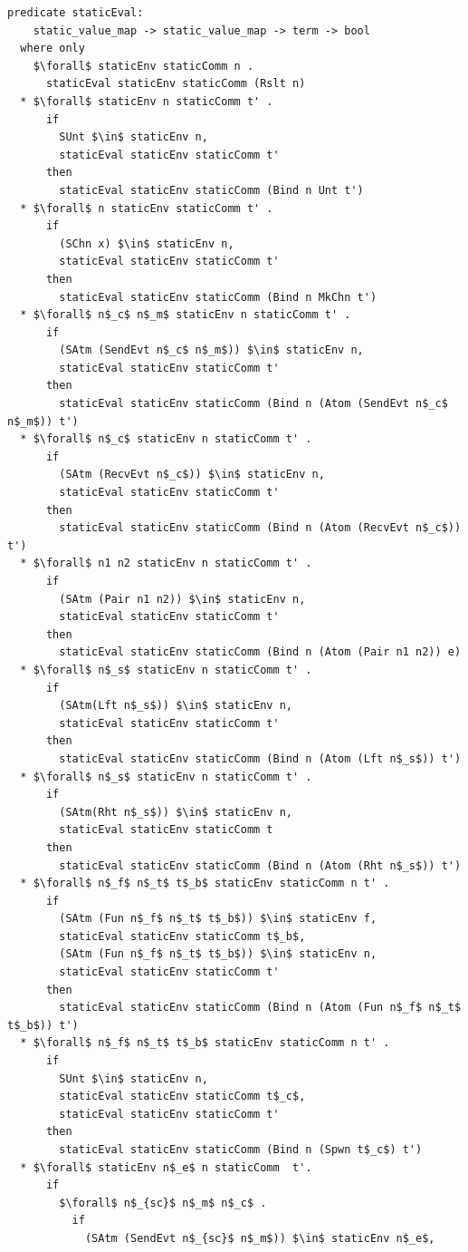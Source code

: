\documentclass[letterpaper, 11pt]{extarticle}
\begin{document}
\begin{lstlisting}[language=logic, mathescape]
  predicate staticEval:
    static_value_map -> static_value_map -> term -> bool
  where only
    $\forall$ staticEnv staticComm n .
      staticEval staticEnv staticComm (Rslt n)
  * $\forall$ staticEnv n staticComm t' .
      if 
        SUnt $\in$ staticEnv n,
        staticEval staticEnv staticComm t'
      then
        staticEval staticEnv staticComm (Bind n Unt t')
  * $\forall$ n staticEnv staticComm t' .
      if 
        (SChn x) $\in$ staticEnv n,
        staticEval staticEnv staticComm t'
      then  
        staticEval staticEnv staticComm (Bind n MkChn t')
  * $\forall$ n$_c$ n$_m$ staticEnv n staticComm t' .
      if
        (SAtm (SendEvt n$_c$ n$_m$)) $\in$ staticEnv n,
        staticEval staticEnv staticComm t' 
      then
        staticEval staticEnv staticComm (Bind n (Atom (SendEvt n$_c$ n$_m$)) t')
  * $\forall$ n$_c$ staticEnv n staticComm t' . 
      if 
        (SAtm (RecvEvt n$_c$)) $\in$ staticEnv n,
        staticEval staticEnv staticComm t'
      then
        staticEval staticEnv staticComm (Bind n (Atom (RecvEvt n$_c$)) t')
  * $\forall$ n1 n2 staticEnv n staticComm t' .
      if
        (SAtm (Pair n1 n2)) $\in$ staticEnv n,
        staticEval staticEnv staticComm t'
      then
        staticEval staticEnv staticComm (Bind n (Atom (Pair n1 n2)) e)
  * $\forall$ n$_s$ staticEnv n staticComm t' .
      if
        (SAtm(Lft n$_s$)) $\in$ staticEnv n,
        staticEval staticEnv staticComm t' 
      then
        staticEval staticEnv staticComm (Bind n (Atom (Lft n$_s$)) t')
  * $\forall$ n$_s$ staticEnv n staticComm t' .
      if
        (SAtm(Rht n$_s$)) $\in$ staticEnv n, 
        staticEval staticEnv staticComm t
      then
        staticEval staticEnv staticComm (Bind n (Atom (Rht n$_s$)) t')
  * $\forall$ n$_f$ n$_t$ t$_b$ staticEnv staticComm n t' .
      if
        (SAtm (Fun n$_f$ n$_t$ t$_b$)) $\in$ staticEnv f, 
        staticEval staticEnv staticComm t$_b$, 
        (SAtm (Fun n$_f$ n$_t$ t$_b$)) $\in$ staticEnv n, 
        staticEval staticEnv staticComm t'
      then
        staticEval staticEnv staticComm (Bind n (Atom (Fun n$_f$ n$_t$ t$_b$)) t')
  * $\forall$ n$_f$ n$_t$ t$_b$ staticEnv staticComm n t' .
      if
        SUnt $\in$ staticEnv n, 
        staticEval staticEnv staticComm t$_c$, 
        staticEval staticEnv staticComm t'
      then
        staticEval staticEnv staticComm (Bind n (Spwn t$_c$) t')
  * $\forall$ staticEnv n$_e$ n staticComm  t'.
      if
        $\forall$ n$_{sc}$ n$_m$ n$_c$ . 
          if
            (SAtm (SendEvt n$_{sc}$ n$_m$)) $\in$ staticEnv n$_e$, 

\end{lstlisting}
\end{document}
